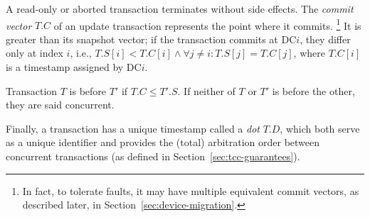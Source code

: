 A read-only or aborted transaction terminates without side effects.
The \emph{commit vector} $T.C$ of an update transaction represents the point
where it commits.%
% 
\footnote{
%
  In fact, to tolerate faults, it may have multiple equivalent commit
  vectors, as described later, in Section~\ref{sec:device-migration}.
}
%
It is greater than its snapshot vector; if the transaction commits at
DC$i$, they differ only at index $i$, i.e., $T.S[i] < T.C[i] \land
\forall j \neq i: T.S[j] = T.C[j]$, where $T.C[i]$ is a timestamp
assigned by DC$i$.

Transaction $T$ is before $T'$ if $T.C \le T'.S$.
If neither of $T$ or $T'$ is before the other, they are said concurrent.

Finally, a transaction has a unique timestamp called a \emph{dot} $T.D$,
which both serve as a unique identifier and provides the (total)
{arbitration order} between concurrent transactions
(as defined in Section~\ref{sec:tcc-guarantees}).

